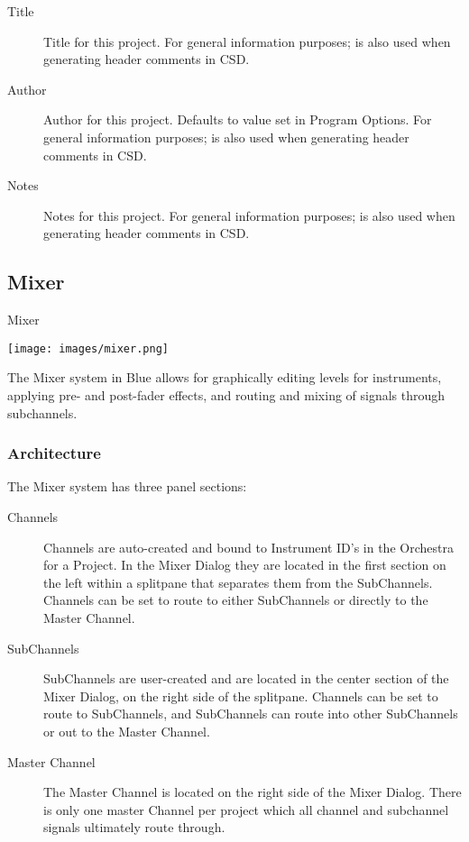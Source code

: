 \begin{description}
\item[Title]
Title for this project. For general information purposes; is also used
when generating header comments in CSD.
\item[Author]
Author for this project. Defaults to value set in Program Options. For
general information purposes; is also used when generating header
comments in CSD.
\item[Notes]
Notes for this project. For general information purposes; is also used
when generating header comments in CSD.
\end{description}

\subsection{Mixer}\label{mixer}

Mixer

\texttt{[image: images/mixer.png]}

The Mixer system in Blue allows for graphically editing levels for
instruments, applying pre- and post-fader effects, and routing and
mixing of signals through subchannels.


\subsubsection{Architecture}

The Mixer system has three panel sections:

\begin{description}
\item[Channels]
Channels are auto-created and bound to Instrument ID's in the Orchestra
for a Project. In the Mixer Dialog they are located in the first section
on the left within a splitpane that separates them from the SubChannels.
Channels can be set to route to either SubChannels or directly to the
Master Channel.
\item[SubChannels]
SubChannels are user-created and are located in the center section of
the Mixer Dialog, on the right side of the splitpane. Channels can be
set to route to SubChannels, and SubChannels can route into other
SubChannels or out to the Master Channel.
\item[Master Channel]
The Master Channel is located on the right side of the Mixer Dialog.
There is only one master Channel per project which all channel and
subchannel signals ultimately route through.
\end{description}

